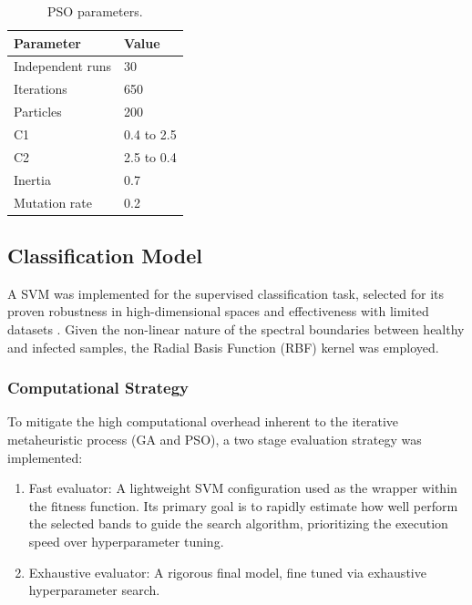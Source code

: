 \documentclass[runningheads]{llncs}
\begin{document}
\begin{table}
    \centering
    \caption{PSO parameters.\label{tab2}}
    \begin{tabular}{ll}
        \hline
        {\bfseries Parameter} & {\bfseries Value}\\
        \hline
        Independent runs & 30 \\
        Iterations & 650\\
        Particles & 200\\
        C1 & 0.4 to 2.5\\
        C2 & 2.5 to 0.4\\
        Inertia & 0.7\\
        Mutation rate & 0.2\\
        \hline
    \end{tabular}           
\end{table}

\subsection{Classification Model}
A SVM was implemented for the supervised classification task, selected for its proven robustness in high-dimensional spaces and effectiveness with limited datasets \cite{nagasubramanian_hyperspectral_2018, musci_ice_2020}. 
Given the non-linear nature of the spectral boundaries between healthy and infected samples, the Radial Basis Function (RBF) kernel was employed.

\subsubsection{Computational Strategy}
To mitigate the high computational overhead inherent to the iterative metaheuristic process (GA and PSO), a two stage evaluation strategy was implemented:
\begin{enumerate}
    \item Fast evaluator: A lightweight SVM configuration used as the wrapper within the fitness function. Its primary goal is to rapidly estimate how well perform the selected bands to guide the search algorithm, prioritizing the execution speed over hyperparameter tuning.
    \item Exhaustive evaluator: A rigorous final model, fine tuned via exhaustive hyperparameter search.
\end{enumerate}
\end{document}
